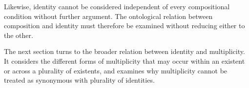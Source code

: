 Likewise, identity cannot be considered independent
of every compositional condition without further
argument. The ontological relation between composition
and identity must therefore be examined without
reducing either to the other.

The next section turns to the broader relation between
identity and multiplicity. It considers the different
forms of multiplicity that may occur within an existent
or across a plurality of existents, and examines why
multiplicity cannot be treated as synonymous with
plurality of identities.

